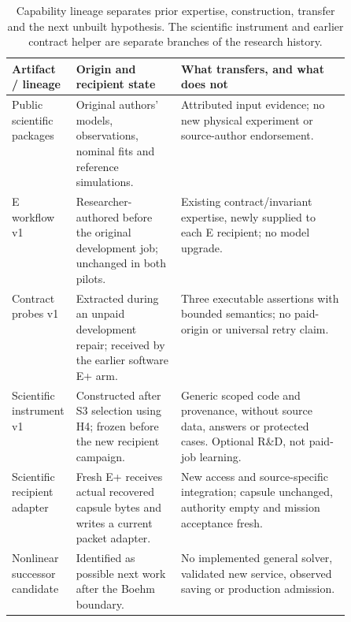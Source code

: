 \begin{table}[H]\small
\begin{tabularx}{\linewidth}{@{}p{0.19\linewidth}p{0.31\linewidth}X@{}}\toprule
Artifact / lineage & Origin and recipient state & What transfers, and what does not \\ \midrule
Public scientific packages & Original authors' models, observations, nominal fits and reference simulations. & Attributed input evidence; no new physical experiment or source-author endorsement. \\
E workflow v1 & Researcher-authored before the original development job; unchanged in both pilots. & Existing contract/invariant expertise, newly supplied to each E recipient; no model upgrade. \\
Contract probes v1 & Extracted during an unpaid development repair; received by the earlier software E+ arm. & Three executable assertions with bounded semantics; no paid-origin or universal retry claim. \\
Scientific instrument v1 & Constructed after S3 selection using H4; frozen before the new recipient campaign. & Generic scoped code and provenance, without source data, answers or protected cases. Optional R\&D, not paid-job learning. \\
Scientific recipient adapter & Fresh E+ receives actual recovered capsule bytes and writes a current packet adapter. & New access and source-specific integration; capsule unchanged, authority empty and mission acceptance fresh. \\
Nonlinear successor candidate & Identified as possible next work after the Boehm boundary. & No implemented general solver, validated new service, observed saving or production admission. \\ \bottomrule
\end{tabularx}
\caption{Capability lineage separates prior expertise, construction, transfer and the next unbuilt hypothesis. The scientific instrument and earlier contract helper are separate branches of the research history.}
\end{table}
